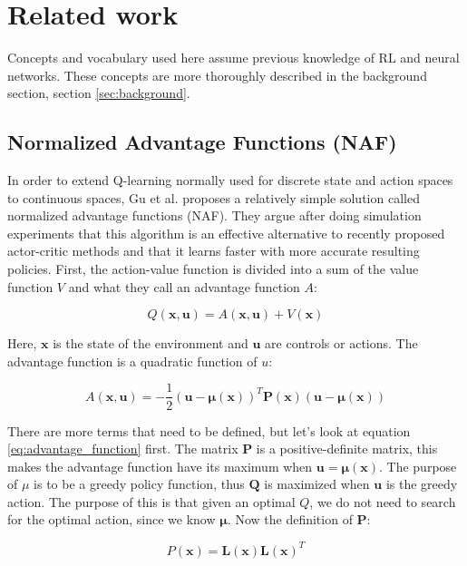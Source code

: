 \section{Related work}

Concepts and vocabulary used here assume previous knowledge of RL and neural
networks. These concepts are more thoroughly described in the background
section, section \ref{sec:background}.

\subsection{Normalized Advantage Functions (NAF)}

In order to extend Q-learning normally used for discrete state and action
spaces to continuous spaces, Gu et al. \cite{gu2016continuous} proposes a
relatively simple solution called normalized advantage functions (NAF). They
argue after doing simulation experiments that this algorithm is an effective
alternative to recently proposed actor-critic methods and that it learns faster
with more accurate resulting policies. First, the action-value function is
divided into a sum of the value function $V$ and what they call an advantage
function $A$:

\begin{equation}
    Q(\mathbf{x}, \mathbf{u}) = A(\mathbf{x}, \mathbf{u}) + V(\mathbf{x})
\end{equation}

Here, $\mathbf{x}$ is the state of the environment and $\mathbf{u}$ are
controls or actions. The advantage function is a quadratic function of $u$:

\begin{equation}
    A(\mathbf{x}, \mathbf{u}) = -\frac{1}{2}(\mathbf{u} - \mathbf{\mu(x)})^T\mathbf{P(x)}(\mathbf{u} - \mathbf{\mu(x)})
    \label{eq:advantage_function}
\end{equation}

There are more terms that need to be defined, but let's look at equation
\ref{eq:advantage_function} first. The matrix $\mathbf{P}$ is a
positive-definite matrix, this makes the advantage function have its maximum
when $\mathbf{u = \mu(x)}$.  The purpose of $\mu$ is to be a greedy policy
function, thus $\mathbf{Q}$ is maximized when $\mathbf{u}$ is the greedy
action. The purpose of this is that given an optimal $Q$, we do not need to
search for the optimal action, since we know $\mathbf{\mu}$. Now the definition
of $\mathbf{P}$:

\begin{equation}
    P(\mathbf{x}) = \mathbf{L(x)L(x)}^T
\end{equation}

